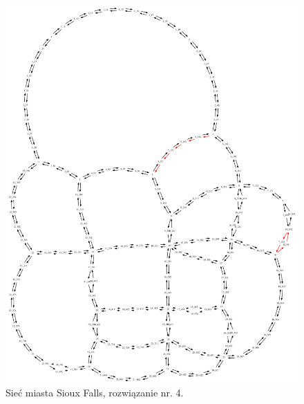 \documentclass[twoside,12pt]{report}
\begin{document}
\begin{figure}[ht]
\centering
\includegraphics[totalheight=0.580\textheight, angle=90]{img/sioux-out/4/network2}
\caption{Sieć miasta Sioux Falls, rozwiązanie nr. 4.}
\label{sioux4}
\end{figure}
\end{document}
